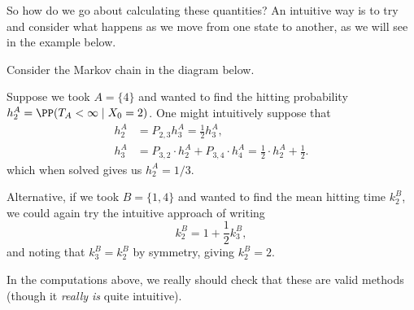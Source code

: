 \documentclass[a4paper]{scrartcl}
\begin{document}
So how do we go about calculating these quantities? An intuitive way is to try and consider what happens as we move from one state to another, as we will see in the example below.

\begin{example}
	Consider the Markov chain in the diagram below.
	\begin{center}
		\end{center}

		Suppose we took $A = \{4\}$ and wanted to find the hitting probability $h_2^A = \PP(T_A < \infty \mid X_0 = 2)$. One might intuitively suppose that
		\begin{align*}
			h_2^A &= P_{2, 3} h_3^A = \frac{1}{2} h_3^A, \\
			h_3^A &= P_{3, 2} \cdot h_2^A + P_{3, 4} \cdot h_4^A = \frac{1}{2} \cdot h_2^A + \frac{1}{2}.
		\end{align*}
		which when solved gives us $h_2^A = 1/3$.

		Alternative, if we took $B = \{1, 4\}$ and wanted to find the mean hitting time $k_2^B$, we could again try the intuitive approach of writing
		$$
		k_2^B = 1 + \frac{1}{2}k_3^B,
		$$
		and noting that $k_3^B = k_2^B$ by symmetry, giving $k_2^B = 2$.
\end{example}

In the computations above, we really should check that these are valid methods (though it \emph{really is} quite intuitive).
\end{document}
